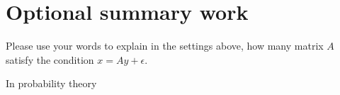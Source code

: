 \documentclass{article}
\newenvironment{answer}{\par\color{ForestGreen}}{\par}
\begin{document}
\section{Optional summary work}
Please use your words to explain in the settings above, how many matrix $A$ satisfy the condition $x = Ay + \epsilon $.

\begin{answer}
    In probability theory
\end{answer}
\end{document}
